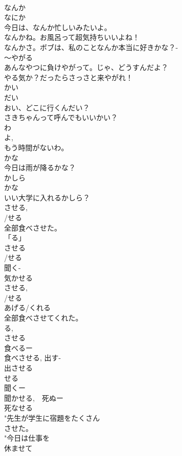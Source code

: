 \documentclass[8pt]{extreport}
\begin{document}
\begin{CJK}{UTF8}{min}
\\	なんか	
\\	なにか
\\	今日は、なんか忙しいみたいよ。 
\\	なんかね。お風呂って超気持ちいいよね！
\\	なんかさ。ボブは、私のことなんか本当に好きかな？-
\\	〜やがる	
\\	あんなやつに負けやがって。じゃ、どうすんだよ？
\\	やる気か？だったらさっさと来やがれ！ 
\\	かい 
\\	だい 
\\	おい、どこに行くんだい？ 
\\	さきちゃんって呼んでもいいかい？
\\	わ 
\\	よ, 
\\	もう時間がないわ。
\\	かな 
\\	今日は雨が降るかな？
\\	かしら	
\\	かな 
\\	いい大学に入れるかしら？ 
\\	させる, 
\\	/せる 
\\	全部食べさせた。
\\	「る」
\\	させる
\\	/せる
\\	聞く-
\\	気かせる
\\	させる, 
\\	/せる 
\\	あげる/くれる	
\\	全部食べさせてくれた。
\\	る, 
\\	させる
\\	食べるー
\\	食べさせる, 出す-
\\	出させる 
\\	せる
\\	聞くー
\\	聞かせる,　死ぬー
\\	死なせる
\\	"先生が学生に宿題をたくさん
\\	させた。
\\	"今日は仕事を
\\	休ませて

\end{CJK}
\end{document}
